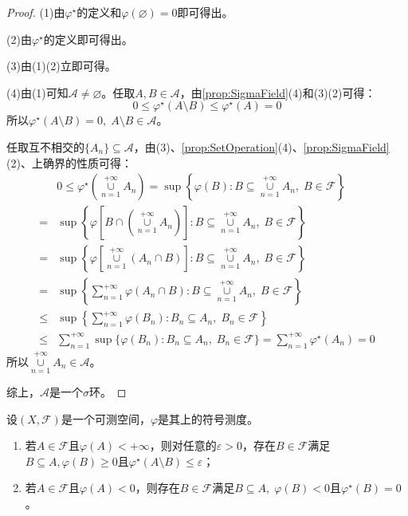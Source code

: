 \begin{proof}
	(1)由$\varphi^{\star}$的定义和$\varphi(\varnothing)=0$即可得出。\par
	(2)由$\varphi^{\star} $的定义即可得出。\par
	(3)由(1)(2)立即可得。\par
	(4)由(1)可知$\mathscr{A}\ne\varnothing$。任取$A,B\in\mathscr{A}$，由\cref{prop:SigmaField}(4)和(3)(2)可得：
	\begin{equation*}
		0\leqslant\varphi^{\star}(A\setminus B)\leqslant\varphi^{\star}(A)=0
	\end{equation*}
	所以$\varphi^{\star}(A\setminus B)=0,\;A\setminus B\in\mathscr{A}$。\par
	任取互不相交的$\{A_n\}\subseteq\mathscr{A}$，由(3)、\cref{prop:SetOperation}(4)、\cref{prop:SigmaField}(2)、上确界的性质可得：
	\begin{align*}
		&0\leqslant\varphi^{\star}\left(\underset{n=1}{\overset{+\infty}{\cup}}A_n\right)=\sup\left\{\varphi(B):B\subseteq\underset{n=1}{\overset{+\infty}{\cup}}A_n,\;B\in\mathscr{F}\right\} \\
		=&\sup\left\{\varphi\left[B\cap\left(\underset{n=1}{\overset{+\infty}{\cup}}A_n\right)\right]:B\subseteq\underset{n=1}{\overset{+\infty}{\cup}}A_n,\;B\in\mathscr{F}\right\} \\
		=&\sup\left\{\varphi\left[\underset{n=1}{\overset{+\infty}{\cup}}(A_n\cap B)\right]:B\subseteq\underset{n=1}{\overset{+\infty}{\cup}}A_n,\;B\in\mathscr{F}\right\} \\
		=&\sup\left\{\sum_{n=1}^{+\infty}\varphi(A_n\cap B):B\subseteq\underset{n=1}{\overset{+\infty}{\cup}}A_n,\;B\in\mathscr{F}\right\} \\
		\leqslant&\sup\left\{\sum_{n=1}^{+\infty}\varphi(B_n):B_n\subseteq A_n,\;B_n\in\mathscr{F}\right\} \\
		\leqslant&\sum_{n=1}^{+\infty}\sup\{\varphi(B_n):B_n\subseteq A_n,\;B_n\in\mathscr{F}\}=\sum_{n=1}^{+\infty}\varphi^{\star}(A_n)=0
	\end{align*}
	所以$\underset{n=1}{\overset{+\infty}{\cup}}A_n\in\mathscr{A}$。\par
	综上，$\mathscr{A}$是一个$\sigma$环。
\end{proof}
\begin{lemma}\label{lem:HahnDecomposition}
	设$(X,\mathscr{F})$是一个可测空间，$\varphi$是其上的符号测度。
	\begin{enumerate}
		\item 若$A\in\mathscr{F}$且$\varphi(A)<+\infty$，则对任意的$\varepsilon>0$，存在$B\in\mathscr{F}$满足$B\subseteq A,\varphi(B)\geqslant0$且$\varphi^{\star}(A\setminus B)\leqslant\varepsilon$；
		\item 若$A\in\mathscr{F}$且$\varphi(A)<0$，则存在$B\in\mathscr{F}$满足$B\subseteq A,\;\varphi(B)<0$且$\varphi^{\star}(B)=0$。
	\end{enumerate}
\end{lemma}
